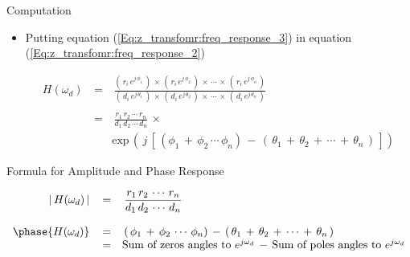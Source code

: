 \begin{frame}[t,allowframebreaks]{Computation}
\begin{itemize}
\begin{equation}
\begin{array}{rcl}
r_i \, e^{j \, \phi_i} \, = \, e^{j \, \omega_d} \, - \, z_i \\
d_i \, e^{j \, \theta_i} \, =  e^{j \, \omega_d} \, - \, p_i 
\end{array}
\label{Eq:z_transfomr:freq_response_3}
\end{equation}

\item Putting equation (\autoref{Eq:z_transfomr:freq_response_3}) in equation (\autoref{Eq:z_transfomr:freq_response_2})

\begin{equation}
\begin{array}{rcl}
H(\omega_d) \, &=& \, \displaystyle\frac{( \, r_i \, e^{j \, \phi_1} \,) \, \times \, ( \,  r_i \, e^{j \, \phi_2}\,) \, \times \, \cdots \, \times \, ( \, r_i \, e^{j \, \phi_n} \,)}{( \,  d_i \, e^{j \, \theta_1} \,) \, \times \,( \, d_i \, e^{j \, \theta_2} \,) \, \times \, \cdots \, \times \,( \,  d_i \, e^{j \, \theta_n} \,)} \\ \\
		&=& \, \displaystyle\frac{r_1 \, r_2 \, \cdots \, r_n}{d_1 \, d_2 \, \cdots \, d_n} \, \times \,  \\
		&&  \text{exp} \, (\, j \, \left[ \,  ( \phi_1 \, + \, \phi_2 \, \cdots \, \phi_n ) \, - \, (\, \theta_1 \, + \, \theta_2 \, + \, \cdots \, + \, \theta_n \,) \,\right] )
\end{array}
\end{equation}

\end{itemize}


\end{frame}

\begin{frame}[t]{Formula for Amplitude and Phase Response}

\begin{equation}
\begin{array}{rcl}
\lvert\, H(\omega_d) \, \rvert \, &=& \, \displaystyle\frac{r_1 \, r_2 \, \cdots \, r_n}{d_1 \, d_2 \, \cdots \, d_n} \\ \\
 \phase{H(\omega_d)} \, &=& \, (\, \phi_1 \, + \, \phi_2 \, \cdots \, \phi_n ) \, - \, (\, \theta_1 \, + \, \theta_2 \, + \, \cdots \, + \, \theta_n \,) \\
 		&=& \text{Sum of zeros angles to } e^{j \omega_d} \, - \,  \text{Sum of poles angles to } e^{j \omega_d}
\end{array}
\end{equation}

\end{frame}


